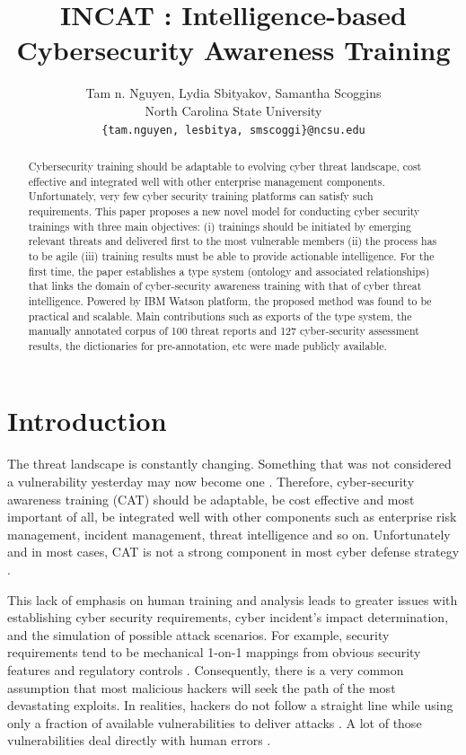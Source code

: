 \documentclass{article} %
\title{INCAT : Intelligence-based Cybersecurity Awareness Training}
\author{
Tam n. Nguyen, Lydia Sbityakov, Samantha Scoggins\\
North Carolina State University\\
\texttt{\{tam.nguyen, lesbitya, smscoggi\}@ncsu.edu} \\
}
\begin{document}
\maketitle

\begin{abstract}
  Cybersecurity training should be adaptable to evolving cyber threat landscape, cost effective and integrated well with other enterprise management components. Unfortunately, very few cyber security training platforms can satisfy such requirements. This paper proposes a new novel model for conducting cyber security trainings with three main objectives: (i) trainings should be initiated by emerging relevant threats and delivered first to the most vulnerable members (ii) the process has to be agile (iii) training results must be able to provide actionable intelligence. For the first time, the paper establishes a type system (ontology and associated relationships) that links the domain of cyber-security awareness training with that of cyber threat intelligence. Powered by IBM Watson platform, the proposed method was found to be practical and scalable. Main contributions such as exports of the type system, the manually annotated corpus of 100 threat reports and 127 cyber-security assessment results, the dictionaries for pre-annotation, etc were made publicly available.
\end{abstract}

\section{Introduction}
The threat landscape is constantly changing. Something that was not considered a vulnerability yesterday may now become one \cite{Manadhata2011AnMetric}. Therefore, cyber-security awareness training (CAT) should be adaptable, be cost effective and most important of all, be integrated well with other components such as enterprise risk management, incident management, threat intelligence and so on. Unfortunately and in most cases, CAT is not a strong component in most cyber defense strategy \cite{Jakoubi2009AManagement}.

This lack of emphasis on human training and analysis leads to greater issues with establishing cyber security requirements, cyber incident's impact determination, and the simulation of possible attack scenarios. For example, security requirements tend to be mechanical 1-on-1 mappings from obvious security features and regulatory controls \cite{Cleland-Huang2014HowGratae}. Consequently, there is a very common assumption that most malicious hackers will seek the path of the most devastating exploits. In realities, hackers do not follow a straight line while using only a fraction of available vulnerabilities to deliver attacks \cite{Allodi2017TowardsAssumptions}. A lot of those vulnerabilities deal directly with human errors \cite{Messaoud2017AdvancedChallenges}.
\end{document}
